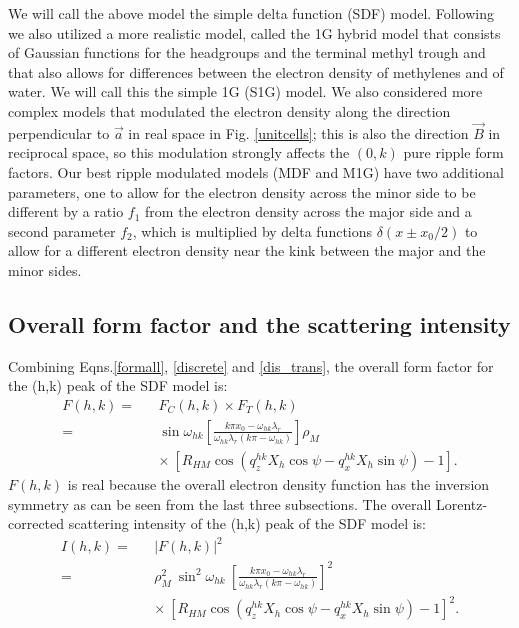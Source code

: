We will call the above model the simple delta function (SDF) model.
Following \cite{WSN89} we also utilized a more realistic model, called the 1G 
hybrid model that consists of Gaussian functions for the headgroups and
the terminal methyl trough and that also allows for differences between 
the electron density of methylenes and of water. We will call this the simple 
1G (S1G) model. We also considered more complex models that modulated the 
electron density along the direction perpendicular to $\vec{a}$ in real space 
in Fig. \ref{unitcells}; this is also the direction $\vec{B}$ in reciprocal 
space, so this modulation strongly affects the $(0,k)$ pure ripple form 
factors. Our best ripple modulated models (MDF and M1G) have two additional 
parameters, one to allow for the electron density across the minor side to 
be different by a ratio $f_1$ from the electron density across the major 
side and a second parameter $f_2$, which is multiplied by delta functions 
${\delta}(x \pm x_0/2)$ to allow for a different electron density near 
the kink between the major and the minor sides.

\subsection{Overall form factor and the scattering intensity}
\label{rppl_theory_5}

Combining Eqns.\ref{formall}, \ref{discrete} and \ref{dis_trans}, the overall 
form factor for the (h,k) peak of the SDF model is:
\begin{eqnarray}
\label{form_dis}
F(h,k) =&& F_C (h,k) \times F_T (h,k) \nonumber\\
=&& \sin \omega_{hk} \left[\frac{k \pi x_0 -
\omega_{hk} \lambda_r}{\omega_{hk} \lambda_r (k \pi - \omega_{hk})} \right]
 \rho_M \nonumber\\ 
&& \times\ [R_{HM} \cos (q_z^{hk} X_h \cos \psi - q_x^{hk} X_h \sin \psi) -1].
\end{eqnarray}
$F(h,k)$ is real because the overall electron density function has the 
inversion symmetry as can be seen from the last three subsections.
The overall Lorentz-corrected scattering intensity of the (h,k) peak
of the SDF model is:
\begin{eqnarray}
\label{inten_dis}
I(h,k) =&& |F(h,k)|^2 \nonumber\\
=&& \rho_M^2\ \sin^2 \omega_{hk}\ \left[\frac{k \pi x_0 -
\omega_{hk} \lambda_r}{\omega_{hk} 
\lambda_r (k \pi - \omega_{hk})} \right]^2 \nonumber\\ 
&& \times\ [R_{HM} \cos (q_z^{hk} X_h \cos \psi - q_x^{hk} X_h \sin \psi) -1]^2.
\end{eqnarray}

